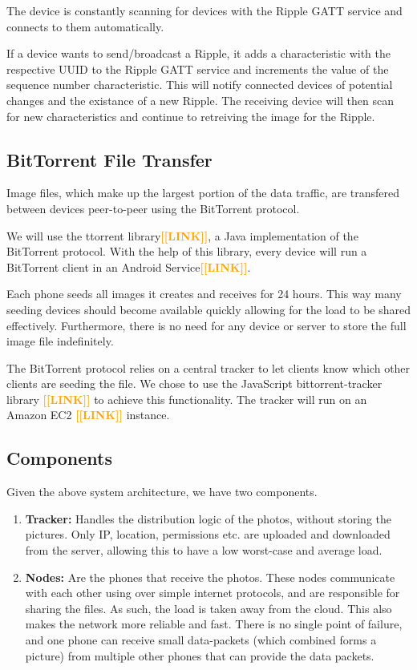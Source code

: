 \documentclass{report}
\newcommand{\todo}[1]{\textsf{\textbf{\textcolor{orange}{[[#1]]}}}}
\begin{document}
The device is constantly scanning for devices with the Ripple GATT service and connects to them automatically.

If a device wants to send/broadcast a Ripple, it adds a characteristic with the respective UUID to the Ripple GATT service and increments the value of the sequence number characteristic. This will notify connected devices of potential changes and the existance of a new Ripple. The receiving device will then scan for new characteristics and continue to retreiving the image for the Ripple.


\subsection{BitTorrent File Transfer}
Image files, which make up the largest portion of the data traffic, are transfered between devices peer-to-peer using the BitTorrent protocol.

We will use the ttorrent library\todo{LINK}, a Java implementation of the BitTorrent protocol. With the help of this library, every device will run a BitTorrent client in an Android Service\todo{LINK}.

Each phone seeds all images it creates and receives for 24 hours. This way many seeding devices should become available quickly allowing for the load to be shared effectively. Furthermore, there is no need for any device or server to store the full image file indefinitely.

The BitTorrent protocol relies on a central tracker to let clients know which other clients are seeding the file. We chose to use the JavaScript bittorrent-tracker library \todo{LINK} to achieve this functionality. The tracker will run on an Amazon EC2 \todo{LINK} instance.

\subsection{Components}
Given the above system architecture, we have two components. 

\begin{enumerate}
\item \textbf{Tracker:} Handles the distribution logic of the photos, without storing the pictures. 
Only IP, location, permissions etc. are uploaded and downloaded from the server, allowing this to have a low worst-case and average load. 
\item \textbf{Nodes:} Are the phones that receive the photos. 
These nodes communicate with each other using over simple internet protocols, and are responsible for sharing the files. As such, the load is taken away from the cloud. 
This also makes the network more reliable and fast. There is no single point of failure, and one phone can receive small data-packets (which combined forms a picture) from multiple other phones that can provide the data packets.
\end{enumerate}
\end{document}
